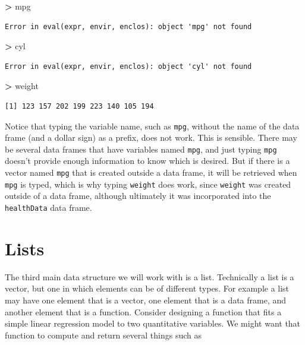 \documentclass[
]{krantz}
\makeatletter
\newenvironment{Shaded}{\begin{snugshade}}{\end{snugshade}}
\newcommand{\NormalTok}[1]{#1}
\newcommand{\OperatorTok}[1]{\textcolor[rgb]{0.43,0.43,0.43}{\textbf{#1}}}
\newcommand{\StringTok}[1]{\textcolor[rgb]{0.5,0.5,0.5}{#1}}
\newenvironment{kframe}{%
\medskip{}
\setlength{\fboxsep}{.8em}
 \def\at@end@of@kframe{}%
 \ifinner\ifhmode%
  \def\at@end@of@kframe{\end{minipage}}%
  \begin{minipage}{\columnwidth}%
 \fi\fi%
 \def\FrameCommand##1{\hskip\@totalleftmargin \hskip-\fboxsep
 \colorbox{shadecolor}{##1}\hskip-\fboxsep
     \hskip-\linewidth \hskip-\@totalleftmargin \hskip\columnwidth}%
 \MakeFramed {\advance\hsize-\width
   \@totalleftmargin\z@ \linewidth\hsize
   \@setminipage}}%
 {\par\unskip\endMakeFramed%
 \at@end@of@kframe}
\renewenvironment{Shaded}{\begin{kframe}}{\end{kframe}}
\makeatother
\begin{document}
\begin{Shaded}
\begin{Highlighting}[]
\OperatorTok{\textgreater{}}\StringTok{ }\NormalTok{mpg}
\end{Highlighting}
\end{Shaded}

\begin{verbatim}
Error in eval(expr, envir, enclos): object 'mpg' not found
\end{verbatim}

\begin{Shaded}
\begin{Highlighting}[]
\OperatorTok{\textgreater{}}\StringTok{ }\NormalTok{cyl}
\end{Highlighting}
\end{Shaded}

\begin{verbatim}
Error in eval(expr, envir, enclos): object 'cyl' not found
\end{verbatim}

\begin{Shaded}
\begin{Highlighting}[]
\OperatorTok{\textgreater{}}\StringTok{ }\NormalTok{weight}
\end{Highlighting}
\end{Shaded}

\begin{verbatim}
[1] 123 157 202 199 223 140 105 194
\end{verbatim}

Notice that typing the variable name, such as \texttt{mpg}, without the name of the data frame (and a dollar sign) as a prefix, does not work. This is sensible. There may be several data frames that have variables named \texttt{mpg}, and just typing \texttt{mpg} doesn't provide enough information to know which is desired. But if there is a vector named \texttt{mpg} that is created outside a data frame, it will be retrieved when \texttt{mpg} is typed, which is why typing \texttt{weight} does work, since \texttt{weight} was created outside of a data frame, although ultimately it was incorporated into the \texttt{healthData} data frame.

\hypertarget{lists}{%
\section{Lists}\label{lists}}

The third main data structure we will work with is a list. Technically a list is a vector, but one in which elements can be of different types. For example a list may have one element that is a vector, one element that is a data frame, and another element that is a function. Consider designing a function that fits a simple linear regression model to two quantitative variables. We might want that function to compute and return several things such as
\end{document}
